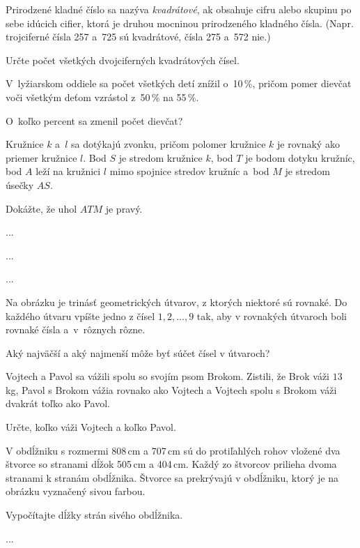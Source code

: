 {%
Prirodzené kladné číslo sa nazýva {\it kvadrátové\/}, ak obsahuje cifru alebo skupinu po sebe idúcich cifier, ktorá je druhou mocninou prirodzeného kladného čísla.
(Napr. trojciferné čísla 257 a~725 sú kvadrátové, čísla 275 a~572 nie.)

Určte počet všetkých dvojciferných kvadrátových čísel.
}

{%
V~lyžiarskom oddiele sa počet všetkých detí znížil o~10\,\%, pričom pomer dievčat voči všetkým deťom vzrástol z~50\,\% na 55\,\%.

O~koľko percent sa zmenil počet dievčat?
}

{%
Kružnice $k$ a~$l$ sa dotýkajú zvonku, pričom polomer kružnice $k$ je rovnaký ako priemer kružnice $l$.
Bod $S$ je stredom kružnice $k$,
bod $T$ je bodom dotyku kružníc,
bod $A$ leží na kružnici $l$ mimo spojnice stredov kružníc
a~bod $M$ je stredom úsečky $AS$.

Dokážte, že uhol $ATM$ je pravý.
}


{%
...}

{%
...}

{%
...}

{%
Na obrázku je trinásť geometrických útvarov, z ktorých niektoré sú rovnaké.
Do každého útvaru vpíšte jedno z čísel $1, 2, \dots, 9$ tak, aby v rovnakých útvaroch boli rovnaké čísla a~v~rôznych rôzne.

Aký najväčší a aký najmenší môže byť súčet čísel v útvaroch?
%
}

{%
Vojtech a Pavol sa vážili spolu so svojím psom Brokom.
Zistili, že Brok váži $13$ kg, Pavol s Brokom vážia rovnako ako Vojtech a Vojtech spolu s Brokom váži dvakrát toľko ako Pavol.

Určte, koľko váži Vojtech a koľko Pavol.
}

{%
V obdĺžniku s rozmermi 808\,cm a 707\,cm sú do protiľahlých rohov vložené dva štvorce so stranami dĺžok 505\,cm a 404\,cm.
Každý zo štvorcov prilieha dvoma stranami k stranám obdĺžnika.
Štvorce sa prekrývajú v obdĺžniku, ktorý je na obrázku vyznačený sivou farbou.

Vypočítajte dĺžky strán sivého obdĺžnika.
%
}

{%
...}

